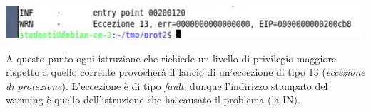 \begin{center}\includegraphics{img/123.PNG}\end{center}
A questo punto ogni istruzione che richiede un livello di privilegio maggiore rispetto a quello corrente provocherà il lancio di un'eccezione di tipo 13 (\emph{eccezione di protezione}). L'eccezione è di tipo \emph{fault}, dunque l'indirizzo stampato del warming è quello dell'istruzione che ha causato il problema (la IN). 